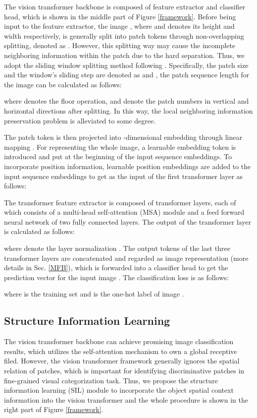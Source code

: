 \documentclass[sigconf, nonacm]{acmart}
\begin{document}
The vision transformer backbone is composed of feature extractor and classifier head, which is shown in the middle part of Figure \ref{framework}. Before being input to the feature extractor, the image , where  and  denotes its height and width respectively, is generally split into  patch tokens through non-overlapping splitting, denoted as . However, this splitting way may cause the incomplete neighboring information within the patch due to the hard separation. Thus, we adopt the sliding window splitting method following \cite{he2021transreid}. Specifically, the patch size and the window’s sliding step are denoted as  and , the patch sequence length  for the image  can be calculated as follows:

where  denotes the floor operation,  and  denote the patch numbers in vertical and horizontal directions after splitting. In this way, the local neighboring information preservation problem is alleviated to some degree. 

The patch token  is then projected into -dimensional embedding through linear mapping . For representing the whole image, a learnable  embedding token  is introduced and put at the beginning of the input sequence embeddings. To incorporate position information, learnable position embeddings  are added to the input sequence embeddings to get  as the input of the first transformer layer as follows:

The transformer feature extractor is composed of  transformer layers, each of which consists of a multi-head self-attention (MSA) module and a feed forward neural network of two fully connected layers. The output of the  transformer layer is calculated as follows:


where  denote the layer normalization \cite{ba2016layer}. The output  tokens of the last three transformer layers are concatenated and regarded as image representation (more details in Sec. \ref{MFB}), which is forwarded into a classifier head to get the prediction vector  for the input image . The classification loss is as follows:

where  is the training set and  is the one-hot label of image .


\subsection{Structure Information Learning}\label{SIL}

The vision transformer backbone can achieve promising image classification results, which utilizes the self-attention mechanism to own a global receptive filed. However, the vision transformer framework generally ignores the spatial relation of patches, which is important for identifying discriminative patches in fine-grained visual categorization task. Thus, we propose the structure information learning (SIL) module to incorporate the object spatial context information into the vision transformer and the whole procedure is shown in the right part of Figure \ref{framework}.
\end{document}
